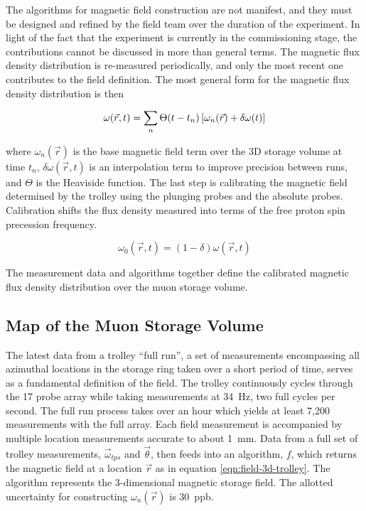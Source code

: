 The algorithms for magnetic field construction are not manifest, and they must be designed and refined by the field team over the duration of the experiment.  In light of the fact that the experiment is currently in the commissioning stage, the contributions cannot be discussed in more than general terms.  The magnetic flux density distribution is re-measured periodically, and only the most recent one contributes to the field definition. The most general form for the magnetic flux density distribution is then

\begin{equation}
\label{eqn:field-construction}
\omega(\vec{r}, t) = \sum_n \Theta(t - t_n) \\
\left[\omega_{n}(\vec{r}) + \delta \omega(t) \right]
\end{equation}

\noindent
where $\omega_{n}(\vec{r})$ is the base magnetic field term over the 3D storage volume at time $t_n$, $\delta \omega(\vec{r}, t)$ is an interpolation term to improve precision between runs, and $\Theta$ is the Heaviside function.  The last step is calibrating the magnetic field determined by the trolley using the plunging probes and the absolute probes. Calibration shifts the flux density measured into terms of the free proton spin precession frequency.

\begin{equation}
\label{eqn:field-calibration}
\omega_0(\vec{r}, t) = (1 - \delta) \omega(\vec{r}, t)
\end{equation}

\noindent The measurement data and algorithms together define the calibrated magnetic flux density distribution over the muon storage volume.

\subsection{Map of the Muon Storage Volume}

The latest data from a trolley ``full run'', a set of measurements encompassing all azimuthal locations in the storage ring taken over a short period of time, serves as a fundamental definition of the field.  The trolley continuously cycles through the 17 probe array while taking measurements at \SI{34}{\Hz}, two full cycles per second.  The full run process takes over an hour which yields at least 7,200 measurements with the full array. Each field measurement is accompanied by multiple location measurements accurate to about \SI{1}{\mm}.  Data from a full set of trolley measurements, $\vec{\omega}_{tps}$ and $\vec{\theta}$, then feeds into an algorithm, $f$, which returns the magnetic field at a location $\vec{r}$ as in equation \ref{eqn:field-3d-trolley}.  The algorithm represents the 3-dimensional magnetic storage field.  The allotted uncertainty for constructing $\omega_{n}(\vec{r})$ is \SI{30}{ppb}.

